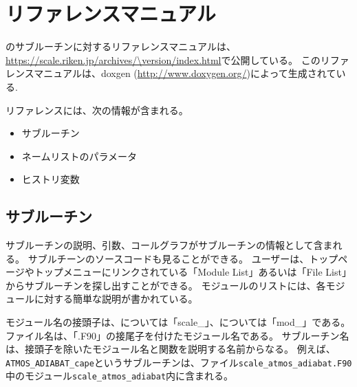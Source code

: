 \section{リファレンスマニュアル} \label{sec:reference_manual}
\scalelib のサブルーチンに対するリファレンスマニュアルは、\url{https://scale.riken.jp/archives/\version/index.html}で公開している。
このリファレンスマニュアルは、doxgen (\url{http://www.doxygen.org/})によって生成されている.

リファレンスには、次の情報が含まれる。
\begin{itemize}
\item サブルーチン
\item ネームリストのパラメータ
\item ヒストリ変数
\end{itemize}


\subsection{サブルーチン}
サブルーチンの説明、引数、コールグラフがサブルーチンの情報として含まれる。
サブルチーンのソースコードも見ることができる。
ユーザーは、トップページやトップメニューにリンクされている「Module List」あるいは「File List」からサブルーチンを探し出すことができる。
モジュールのリストには、各モジュールに対する簡単な説明が書かれている。

モジュール名の接頭子は、\scalelib については「scale\_」、\scalerm については「mod\_」である。
ファイル名は、「.F90」の接尾子を付けたモジュール名である。
サブルーチン名は、接頭子を除いたモジュール名と関数を説明する名前からなる。
例えば、\verb|ATMOS_ADIABAT_cape|というサブルーチンは、ファイル\verb|scale_atmos_adiabat.F90|中のモジュール\verb|scale_atmos_adiabat|内に含まれる。



